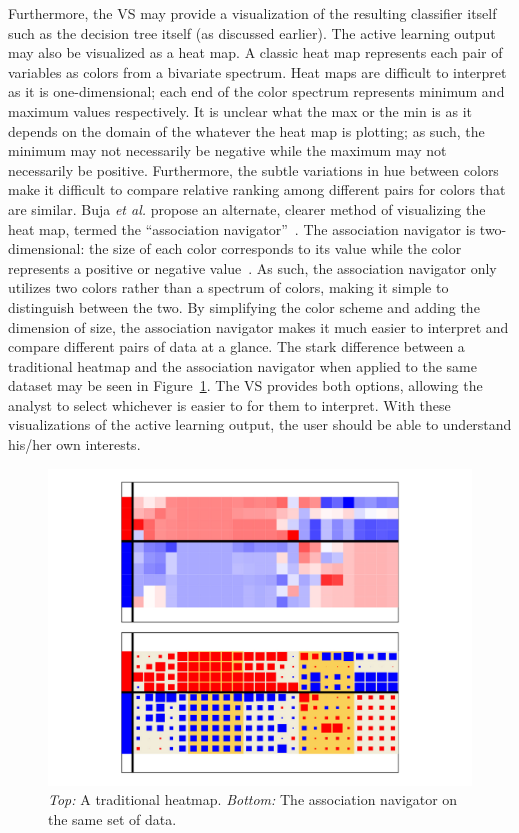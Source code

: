 Furthermore, the VS may provide a visualization of the resulting classifier 
itself such as the decision tree itself (as discussed earlier). The active 
learning output may also be visualized as a heat map. A 
classic heat map represents each pair of variables as colors from a bivariate 
spectrum. Heat maps are difficult to interpret as it is one-dimensional; each 
end of the color spectrum represents minimum and maximum values respectively. 
It is unclear what the max or the min is as it depends on the domain of the 
whatever the heat map is plotting; as such, the minimum may not necessarily be 
negative while the maximum may not necessarily be positive. Furthermore, the 
subtle variations in hue between colors make it difficult to compare relative 
ranking among different pairs for colors that are similar. Buja \textit{et al.} 
propose an alternate, clearer method of visualizing the heat map, termed the 
``association navigator''~\cite{buja2016}. The association navigator is 
two-dimensional: the size of each color corresponds to its value while the 
color 
represents a positive or negative value~\cite{buja2016}. As such, the 
association navigator only utilizes two colors rather than a spectrum of 
colors, making it simple to distinguish between the two. By simplifying the 
color scheme and adding the dimension of size, the association navigator makes 
it much easier to interpret and compare different pairs of data at a glance. 
The stark difference between a traditional heatmap and the association 
navigator when applied to the same dataset may be seen in 
Figure~\ref{fig:visualizer:heatmap}. The VS provides both options, allowing the 
analyst to select whichever is easier to for them to interpret. 
With these visualizations of the active learning output, the user should be 
able to understand his/her own interests. 

\begin{figure}[htb]
	\begin{center}
		\includegraphics[width=1\linewidth]{ch-visualizer/figures/heatmap}
		\caption[Heatmap versus association navigator]{\textit{Top:} A 
		traditional heatmap. \textit{Bottom:} The association navigator on the 
		same set of data.}
		\label{fig:visualizer:heatmap}
	\end{center}
\end{figure}

